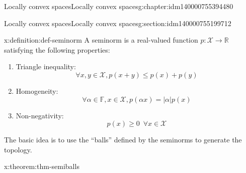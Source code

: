 \documentclass[oneside,10pt,]{book}
\numberwithin{equation}{section}
\newcommand{\R}{\mathbb{R}}
\newcommand{\abs}[1]{\left\vert#1\right\vert}
\numberwithin{equation}{section}
\begin{document}
\begin{chapterptx}{Locally convex spaces}{}{Locally convex spaces}{}{}{g:chapter:idm140000755394480}
\begin{sectionptx}{Locally convex spaces}{}{Locally convex spaces}{}{}{g:section:idm140000755199712}
\begin{definition}{}{x:definition:def-seminorm}
A seminorm is a real-valued function \(p:\mathcal{X} \to \R\) satisfying the following properties:%
\begin{enumerate}
\item{}Triangle inequality:%
\begin{equation*}
\forall x, y \in \mathcal{X}, p(x + y) \leq p(x) + p(y)
\end{equation*}
%
\item{}Homogeneity:%
\begin{equation*}
\forall \alpha \in \mathbb{F}, x \in \mathcal{X}, p(\alpha x) = \abs{\alpha}p(x)
\end{equation*}
%
\item{}Non-negativity:%
\begin{equation*}
p(x) \geq 0 \,\,\,\forall x \in \mathcal{X}
\end{equation*}
%
\end{enumerate}
%
\end{definition}
The basic idea is to use the ``balls'' defined by the seminorms to generate the topology.%
\begin{theorem}{}{}{x:theorem:thm-semiballs}%
%
\end{theorem}
\end{sectionptx}
\end{chapterptx}
\end{document}
